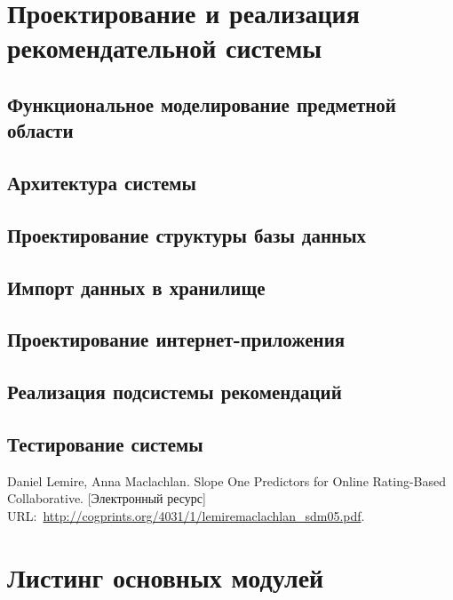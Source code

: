 \documentclass[a4paper,14pt,openany,final]{extreport} %
\renewcommand{\chaptername}{}
\def\oldbibitem{} \let\oldbibitem=\bibitem
\def\bibitem{\stepcounter{bibitemnum}\oldbibitem}
\begin{document}
\chapter{Проектирование и реализация рекомендательной системы}
\label{chap:dev-tech-theory}
\section{Функциональное моделирование предметной области}
\section{Архитектура системы}
\section{Проектирование структуры базы данных}
\section{Импорт данных в хранилище}
\section{Проектирование интернет-приложения}
\section{Реализация подсистемы рекомендаций}
\section{Тестирование системы}

\begin{thebibliography}{99}
 Daniel Lemire, Anna Maclachlan. Slope One Predictors for Online Rating-Based Collaborative. [Электронный ресурс] URL:~\url{http://cogprints.org/4031/1/lemiremaclachlan_sdm05.pdf}.
\end{thebibliography}

\appendix
\renewcommand{\chaptername}{ПРИЛОЖЕНИЕ}
\renewcommand{\thechapter}{\arabic{chapter}}
\chapter{Листинг основных модулей}
\end{document}

